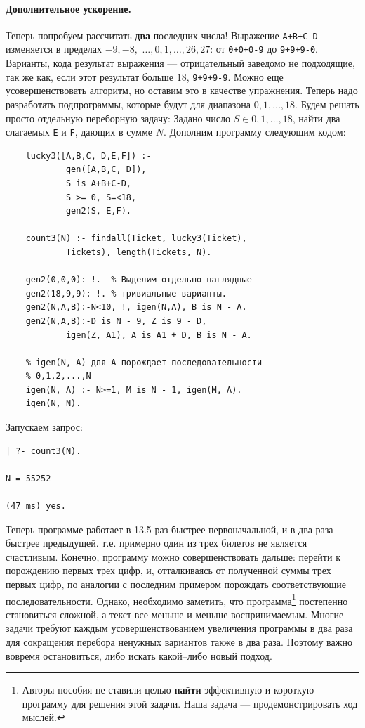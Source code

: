 \documentclass[12pt, openany, twoside]{book} %
\begin{document}
\paragraph{Дополнительное ускорение.} Теперь попробуем рассчитать \textbf{два} последних числа! Выражение \texttt{A+B+C-D} изменяется в пределах $-9,-8,$ $\ldots,0,1,\ldots,26,27$: от \texttt{0+0+0-9} до \texttt{9+9+9-0}. Варианты, кода результат выражения --- отрицательный заведомо не подходящие, так же как, если этот результат больше $18$, \texttt{9+9+9-9}. Можно еще усовершенствовать алгоритм, но оставим это в качестве упражнения. Теперь надо разработать подпрограммы, которые будут для диапазона $0,1,\ldots,18$. Будем решать просто отдельную переборную задачу: Задано число $S \in 0,1,\ldots,18$, найти два слагаемых \texttt{E} и \texttt{F}, дающих в сумме $N$. Дополним программу следующим кодом:
{\tt\begin{verbatim}
    lucky3([A,B,C, D,E,F]) :-
            gen([A,B,C, D]),
            S is A+B+C-D,
            S >= 0, S=<18,
            gen2(S, E,F).

    count3(N) :- findall(Ticket, lucky3(Ticket),
            Tickets), length(Tickets, N).

    gen2(0,0,0):-!.  % Выделим отдельно наглядные
    gen2(18,9,9):-!. % тривиальные варианты.
    gen2(N,A,B):-N<10, !, igen(N,A), B is N - A.
    gen2(N,A,B):-D is N - 9, Z is 9 - D,
            igen(Z, A1), A is A1 + D, B is N - A.

    % igen(N, A) для A порождает последовательности
    % 0,1,2,...,N
    igen(N, A) :- N>=1, M is N - 1, igen(M, A).
    igen(N, N).
\end{verbatim}}
\noindent{} Запускаем запрос:
{\tt\begin{verbatim}
| ?- count3(N).

N = 55252

(47 ms) yes.
\end{verbatim}}
\noindent{}Теперь программе работает в 13.5 раз быстрее первоначальной, и в два раза быстрее предыдущей. т.е. примерно один из трех билетов не является счастливым. Конечно, программу можно совершенствовать дальше: перейти к порождению первых трех цифр, и, отталкиваясь от полученной суммы трех первых цифр, по аналогии с последним примером порождать соответствующие последовательности. Однако, необходимо заметить, что программа\footnote{Авторы пособия не ставили целью \textbf{найти} эффективную и короткую программу для решения этой задачи. Наша задача --- продемонстрировать ход мыслей.} постепенно становиться сложной, а текст все меньше и меньше воспринимаемым. Многие задачи требуют каждым усовершенствованием увеличения программы в два раза для сокращения перебора ненужных вариантов также в два раза. Поэтому важно вовремя остановиться, либо искать какой--либо новый подход.
\end{document}
